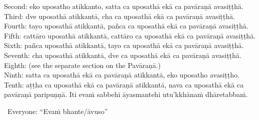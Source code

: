 {{{{{					\hspace*{0.5em}Second: eko uposatho atikkanto, satta ca uposathā ekā ca pavāraṇā avasiṭṭhā.\\
					\hspace*{0.5em}Third: dve uposathā atikkantā, cha ca uposathā ekā ca pavāraṇā avasiṭṭhā.\\
					\hspace*{0.5em}Fourth: tayo uposathā atikkantā, pañca ca uposathā ekā ca pavāraṇā avasiṭṭhā.\\
					\hspace*{0.5em}Fifth: cattāro uposathā atikkantā, cattāro ca uposathā ekā ca pavāraṇā avasiṭṭhā.\\
					\hspace*{0.5em}Sixth: pañca uposathā atikkantā, tayo ca uposathā ekā ca pavāraṇā avasiṭṭhā.\\
					\hspace*{0.5em}Seventh: cha uposathā atikkantā, dve ca uposathā ekā ca pavāraṇā avasiṭṭhā.\\
					\hspace*{0.5em}Eighth: (see the separate section on the Pavāraṇā.)\\
					\hspace*{0.5em}Ninth: satta ca uposathā ekā ca pavāraṇā atikkantā, eko uposatho avasiṭṭho.\\
					\hspace*{0.5em}Tenth: aṭṭha ca uposathā ekā ca pavāraṇā atikkantā, nava ca uposathā ekā ca pavāraṇā paripuṇṇā.}}}}}\makeatother \thickspace
Iti evaṁ sabbehi āyasmantehi utu'kkhānaṁ dhāretabbaṁ.

\begin{center}
	\anglebracketleft\ \hspace{-0.5mm}Everyone: ``Evaṁ bhante/āvuso'' \hspace{-0.5mm}\anglebracketright\
\end{center}

